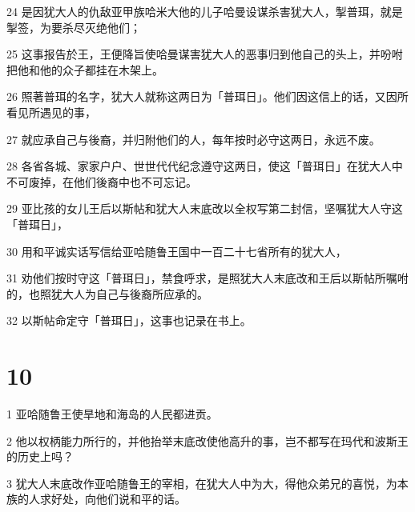 \par 24 是因犹大人的仇敌亚甲族哈米大他的儿子哈曼设谋杀害犹大人，掣普珥，就是掣签，为要杀尽灭绝他们；
\par 25 这事报告於王，王便降旨使哈曼谋害犹大人的恶事归到他自己的头上，并吩咐把他和他的众子都挂在木架上。
\par 26 照著普珥的名字，犹大人就称这两日为「普珥日」。他们因这信上的话，又因所看见所遇见的事，
\par 27 就应承自己与後裔，并归附他们的人，每年按时必守这两日，永远不废。
\par 28 各省各城、家家户户、世世代代纪念遵守这两日，使这「普珥日」在犹大人中不可废掉，在他们後裔中也不可忘记。
\par 29 亚比孩的女儿王后以斯帖和犹大人末底改以全权写第二封信，坚嘱犹大人守这「普珥日」，
\par 30 用和平诚实话写信给亚哈随鲁王国中一百二十七省所有的犹大人，
\par 31 劝他们按时守这「普珥日」，禁食呼求，是照犹大人末底改和王后以斯帖所嘱咐的，也照犹大人为自己与後裔所应承的。
\par 32 以斯帖命定守「普珥日」，这事也记录在书上。

\chapter{10}

\par 1 亚哈随鲁王使旱地和海岛的人民都进贡。
\par 2 他以权柄能力所行的，并他抬举末底改使他高升的事，岂不都写在玛代和波斯王的历史上吗？
\par 3 犹大人末底改作亚哈随鲁王的宰相，在犹大人中为大，得他众弟兄的喜悦，为本族的人求好处，向他们说和平的话。


